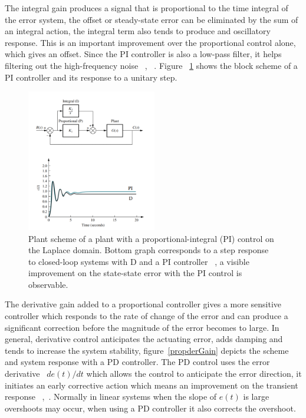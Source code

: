 The integral gain produces a signal that is proportional to the time integral of the error system, the offset or steady-state error can be eliminated by the sum of an integral action, the integral term also tends to produce and oscillatory response. This is an  important improvement over the proportional control alone, which gives an offset. Since the PI controller is also a low-pass filter, it helps filtering out the high-frequency noise  ~\cite[Chapter ~9]{Golnaraghi2010}, ~\cite[Chapter~ 5]{Ogata2009}. Figure ~\ref{PI} shows the block scheme of a PI controller and its response to a unitary step.
\smallskip

\begin{figure}[h]
	\centering
	\includegraphics[width=0.505\textwidth]{Chp2/PI_Dcomp.png}
	\caption{  Plant scheme of   a plant with  a proportional-integral (PI) control   on the Laplace domain. Bottom graph corresponds to a step response to closed-loop systems with D and a PI controller ~\cite[Chapter~ 9]{Nise}, a visible improvement on the state-state error with the PI control is observable.  \label{PI}}
\end{figure}

The derivative gain added to a proportional controller gives a more sensitive controller which responds to the rate of change of the error and can produce a significant correction before the magnitude of the error becomes to large. In general, derivative control anticipates the actuating error, adds damping  and tends to increase the system stability, figure~\ref{propderGain} depicts the scheme and system response with a PD controller. The PD control uses the error derivative ~$de(t)/dt$ which allows the control to anticipate the error direction, it initiates an early corrective action which means an improvement on the transient response   ~\cite[Chapter ~9]{Golnaraghi2010},~\cite[Chapter ~9]{Nise}. Normally in linear systems when the slope of $e(t)$ is large overshoots may occur, when using a PD controller it also corrects the overshoot. 
\smallskip

